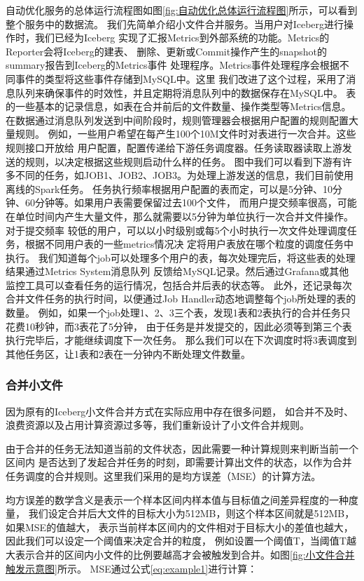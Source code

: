 自动优化服务的总体运行流程图如图\ref{fig:自动优化总体运行流程图}所示，可以看到整个服务中的数据流。
我们先简单介绍小文件合并服务。当用户对Iceberg进行操作时，我们已经为Iceberg
实现了汇报Metrics到外部系统的功能。Metrics的Reporter会将Iceberg的建表、
删除、更新或Commit操作产生的snapshot的summary报告到Iceberg的Metrics事件
处理程序。Metrics事件处理程序会根据不同事件的类型将这些事件存储到MySQL中。这里
我们改进了这个过程，采用了消息队列来确保事件的时效性，并且定期将消息队列中的数据保存在MySQL中。
表的一些基本的记录信息，如表在合并前后的文件数量、操作类型等Metrics信息。
在数据通过消息队列发送到中间阶段时，规则管理器会根据用户配置的规则配置大量规则。
例如，一些用户希望在每产生100个10M文件时对表进行一次合并。这些规则接口开放给
用户配置，配置传递给下游任务调度器。任务读取器读取上游发送的规则，以决定根据这些规则启动什么样的任务。
图中我们可以看到下游有许多不同的任务，如JOB1、JOB2、JOB3。为处理上游发送的信息，我们目前使用离线的Spark任务。
任务执行频率根据用户配置的表而定，可以是5分钟、10分钟、60分钟等。如果用户表需要保留过去100个文件，
而用户提交频率很高，可能在单位时间内产生大量文件，那么就需要以5分钟为单位执行一次合并文件操作。对于提交频率
较低的用户，可以以小时级别或每5个小时执行一次文件处理调度任务，根据不同用户表的一些metrics情况决
定将用户表放在哪个粒度的调度任务中执行。
我们知道每个job可以处理多个用户的表，每次处理完后，将这些表的处理结果通过Metrics System消息队列
反馈给MySQL记录。然后通过Grafana或其他监控工具可以查看任务的运行情况，包括合并后表的状态等。
此外，还记录每次合并文件任务的执行时间，以便通过Job Handler动态地调整每个job所处理的表的数量。
例如，如果一个job处理1、2、3三个表，发现1表和2表执行的合并任务只花费10秒钟，而3表花了5分钟，
由于任务是并发提交的，因此必须等到第三个表执行完毕后，才能继续调度下一次任务。
那么我们可以在下次调度时将3表调度到其他任务区，让1表和2表在一分钟内不断处理文件数量。

\subsubsection{合并小文件}

因为原有的Iceberg小文件合并方式在实际应用中存在很多问题，
如合并不及时、浪费资源以及占用计算资源过多等，我们重新设计了小文件合并规则。

由于合并的任务无法知道当前的文件状态，因此需要一种计算规则来判断当前一个区间内
是否达到了发起合并任务的时刻，即需要计算出文件的状态，以作为合并任务调度的合并规则。这里我们采用的是均方误差（MSE）的计算方法。

均方误差的数学含义是表示一个样本区间内样本值与目标值之间差异程度的一种度量，
我们设定合并后大文件的目标大小为512MB，则这个样本区间就是512MB，如果MSE的值越大，
表示当前样本区间内的文件相对于目标大小的差值也越大，因此我们可以设定一个阈值来决定合并的粒度，
例如设置一个阈值T，当阈值T越大表示合并的区间内小文件的比例要越高才会被触发到合并。如图\ref{fig:小文件合并触发示意图}所示。
MSE通过公式\ref{eq:example1}进行计算：

